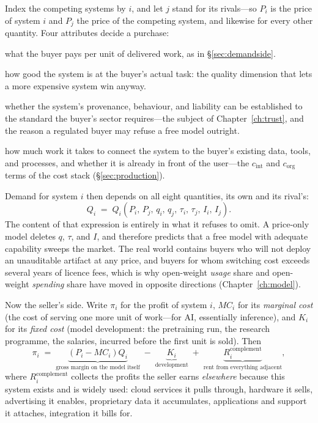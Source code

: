 Index the competing systems by $i$, and let $j$ stand for its rivals---so $P_i$ is the price of system $i$ and $P_j$ the price of the competing system, and likewise for every other quantity. Four attributes decide a purchase:
\begin{description}\itemsep2pt
  \item[$P$ --- price] what the buyer pays per unit of delivered work, as in \S\ref{sec:demandside}.
  \item[$q$ --- capability] how good the system is at the buyer's actual task: the quality dimension that lets a more expensive system win anyway.
  \item[$\tau$ --- trust and assurance] whether the system's provenance, behaviour, and liability can be established to the standard the buyer's sector requires---the subject of Chapter~\ref{ch:trust}, and the reason a regulated buyer may refuse a free model outright.
  \item[$I$ --- integration and distribution] how much work it takes to connect the system to the buyer's existing data, tools, and processes, and whether it is already in front of the user---the $c_{\text{int}}$ and $c_{\text{org}}$ terms of the cost stack (\S\ref{sec:production}).
\end{description}
Demand for system $i$ then depends on all eight quantities, its own and its rival's:
\[
Q_i \;=\; Q_i\!\left(P_i,\, P_j,\, q_i,\, q_j,\, \tau_i,\, \tau_j,\, I_i,\, I_j\right).
\]
The content of that expression is entirely in what it refuses to omit. A price-only model deletes $q$, $\tau$, and $I$, and therefore predicts that a free model with adequate capability sweeps the market. The real world contains buyers who will not deploy an unauditable artifact at any price, and buyers for whom switching cost exceeds several years of licence fees, which is why open-weight \emph{usage} share and open-weight \emph{spending} share have moved in opposite directions (Chapter~\ref{ch:model}).

Now the seller's side. Write $\pi_i$ for the profit of system $i$, $MC_i$ for its \emph{marginal cost} (the cost of serving one more unit of work---for AI, essentially inference), and $K_i$ for its \emph{fixed cost} (model development: the pretraining run, the research programme, the salaries, incurred before the first unit is sold). Then
\[
\pi_i \;=\; \underbrace{\left(P_i - MC_i\right) Q_i}_{\text{gross margin on the model itself}} \;-\; \underbrace{K_i}_{\text{development}} \;+\; \underbrace{R_i^{\mathrm{complement}}}_{\text{rent from everything adjacent}} ,
\]
where $R_i^{\mathrm{complement}}$ collects the profits the seller earns \emph{elsewhere} because this system exists and is widely used: cloud services it pulls through, hardware it sells, advertising it enables, proprietary data it accumulates, applications and support it attaches, integration it bills for.

